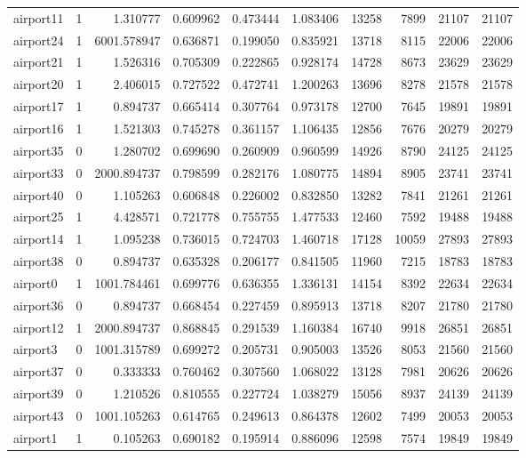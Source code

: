 \begin{longtable}{|l|r|r|r|r|r|r|r|r|r|}
airport11 & 1 & 1.310777 & 0.609962 & 0.473444 & 1.083406 & 13258 & 7899 & 21107 & 21107 \\
airport24 & 1 & 6001.578947 & 0.636871 & 0.199050 & 0.835921 & 13718 & 8115 & 22006 & 22006 \\
airport21 & 1 & 1.526316 & 0.705309 & 0.222865 & 0.928174 & 14728 & 8673 & 23629 & 23629 \\
airport20 & 1 & 2.406015 & 0.727522 & 0.472741 & 1.200263 & 13696 & 8278 & 21578 & 21578 \\
airport17 & 1 & 0.894737 & 0.665414 & 0.307764 & 0.973178 & 12700 & 7645 & 19891 & 19891 \\
airport16 & 1 & 1.521303 & 0.745278 & 0.361157 & 1.106435 & 12856 & 7676 & 20279 & 20279 \\
airport35 & 0 & 1.280702 & 0.699690 & 0.260909 & 0.960599 & 14926 & 8790 & 24125 & 24125 \\
airport33 & 0 & 2000.894737 & 0.798599 & 0.282176 & 1.080775 & 14894 & 8905 & 23741 & 23741 \\
airport40 & 0 & 1.105263 & 0.606848 & 0.226002 & 0.832850 & 13282 & 7841 & 21261 & 21261 \\
airport25 & 1 & 4.428571 & 0.721778 & 0.755755 & 1.477533 & 12460 & 7592 & 19488 & 19488 \\
airport14 & 1 & 1.095238 & 0.736015 & 0.724703 & 1.460718 & 17128 & 10059 & 27893 & 27893 \\
airport38 & 0 & 0.894737 & 0.635328 & 0.206177 & 0.841505 & 11960 & 7215 & 18783 & 18783 \\
airport0 & 1 & 1001.784461 & 0.699776 & 0.636355 & 1.336131 & 14154 & 8392 & 22634 & 22634 \\
airport36 & 0 & 0.894737 & 0.668454 & 0.227459 & 0.895913 & 13718 & 8207 & 21780 & 21780 \\
airport12 & 1 & 2000.894737 & 0.868845 & 0.291539 & 1.160384 & 16740 & 9918 & 26851 & 26851 \\
airport3 & 0 & 1001.315789 & 0.699272 & 0.205731 & 0.905003 & 13526 & 8053 & 21560 & 21560 \\
airport37 & 0 & 0.333333 & 0.760462 & 0.307560 & 1.068022 & 13128 & 7981 & 20626 & 20626 \\
airport39 & 0 & 1.210526 & 0.810555 & 0.227724 & 1.038279 & 15056 & 8937 & 24139 & 24139 \\
airport43 & 0 & 1001.105263 & 0.614765 & 0.249613 & 0.864378 & 12602 & 7499 & 20053 & 20053 \\
airport1 & 1 & 0.105263 & 0.690182 & 0.195914 & 0.886096 & 12598 & 7574 & 19849 & 19849 \\

\end{longtable}
